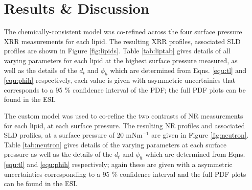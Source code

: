 \documentclass[twoside,twocolumn,9pt]{article}
\begin{document}
\section{Results \& Discussion}
The chemically-consistent model was co-refined across the four surface pressure XRR measurements for each lipid. The resulting XRR profiles, associated SLD profiles are shown in Figure \ref{fig:lipids}. Table \ref{tab:liptab} gives details of all varying parameters for each lipid at the highest surface pressure measured, as well as the details of the $d_t$ and $\phi_h$ which are determined from Eqns. \ref{equ:tl} and \ref{equ:phih} respectively, each value is given with asymmetric uncertainies that corresponds to a 95 \% confidence interval of the PDF; the full PDF plots can be found in the ESI.

The custom model was used to co-refine the two contrasts of NR measurements for each lipid, at each surface pressure. The resulting NR profiles and associated SLD profiles, at a surface pressure of 20 mNm$^{-1}$ are given in Figure \ref{fig:neutron}. Table \ref{tab:neutron} gives details of the varying parameters at each surface pressure as well as the details of the $d_t$ and $\phi_h$ which are determined from Eqns. \ref{equ:tl} and \ref{equ:phih} respectively; again these are given with a asymmetric uncertainties corresponding to a 95 \% confidence interval and the full PDF plots can be found in the ESI.
%
\end{document}
